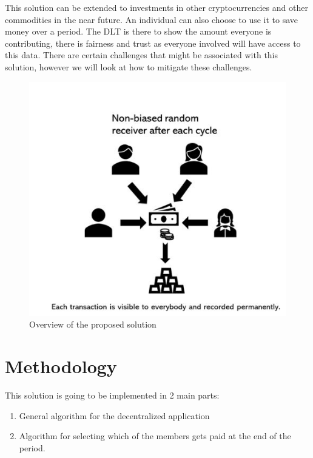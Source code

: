 \documentclass{article}
\begin{document}
\begin{flushleft}
This solution can be extended to investments in other cryptocurrencies and other commodities in the near future. An individual can also choose to use it to save money over a period. The DLT is there to show the amount everyone is contributing, there is fairness and trust as everyone involved will have access to this data. There are certain challenges that might be associated with this solution, however we will look at how to mitigate these challenges.

\begin{figure}[H]
\centering
\includegraphics[scale=1.0]{cop}
\caption{Overview of the proposed solution}
\label{fig:central}
\end{figure}

\section{Methodology}
This solution is going to be implemented in 2 main parts:
\begin{enumerate}
    \item General algorithm for the decentralized application
    \item Algorithm for selecting which of the members gets paid at the end of the period.
\end{enumerate}


\end{flushleft}
\end{document}
